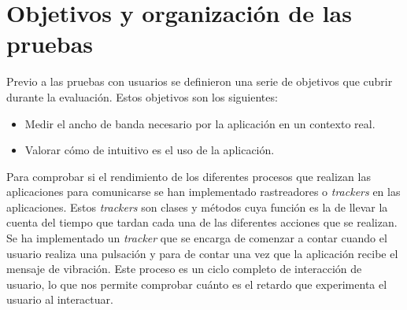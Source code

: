 \begin{figure}[!ht]
     \hfill
     \label{fig:quinta}
   \end{figure}


\section{Objetivos y organizaci\'on de las pruebas}

Previo a las pruebas con usuarios se definieron una serie de objetivos que cubrir durante la evaluaci\'on. Estos objetivos son los siguientes:

\begin {itemize}
\item Medir el ancho de banda necesario por la aplicaci\'on en un contexto real.
\item Valorar c\'omo de intuitivo es el uso de la aplicaci\'on.
\end {itemize}

Para comprobar si el rendimiento de los diferentes procesos que realizan las aplicaciones para comunicarse se han implementado rastreadores o \textit{trackers} en las aplicaciones. Estos \textit{trackers} son clases y m\'etodos cuya funci\'on es la de llevar la cuenta del tiempo que tardan cada una de las diferentes acciones que se realizan. Se ha implementado un \textit{tracker} que se encarga de comenzar a contar cuando el usuario realiza una pulsaci\'on y para de contar una vez que la aplicaci\'on recibe el mensaje de vibraci\'on. Este proceso es un ciclo completo de interacci\'on de usuario, lo que nos permite comprobar cu\'anto es el retardo que experimenta el usuario al interactuar.\\

